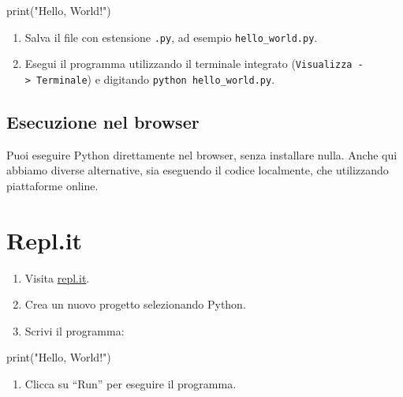\documentclass[
  letterpaper,
  DIV=11,
  numbers=noendperiod]{scrreprt}
\newenvironment{Shaded}{\begin{snugshade}}{\end{snugshade}}
\newcommand{\BuiltInTok}[1]{\textcolor[rgb]{0.00,0.23,0.31}{#1}}
\newcommand{\NormalTok}[1]{\textcolor[rgb]{0.00,0.23,0.31}{#1}}
\newcommand{\StringTok}[1]{\textcolor[rgb]{0.13,0.47,0.30}{#1}}
\providecommand{\tightlist}{%
  \setlength{\itemsep}{0pt}\setlength{\parskip}{0pt}}\usepackage{longtable,booktabs,array}
\begin{document}
\begin{Shaded}
\begin{Highlighting}[]
\BuiltInTok{print}\NormalTok{(}\StringTok{"Hello, World!"}\NormalTok{)}
\end{Highlighting}
\end{Shaded}

\begin{enumerate}
\def\labelenumi{\arabic{enumi}.}
\setcounter{enumi}{5}
\tightlist
\item
  Salva il file con estensione \texttt{.py}, ad esempio
  \texttt{hello\_world.py}.
\item
  Esegui il programma utilizzando il terminale integrato
  (\texttt{Visualizza\ -\textgreater{}\ Terminale}) e digitando
  \texttt{python\ hello\_world.py}.
\end{enumerate}

\subsection{Esecuzione nel browser}\label{esecuzione-nel-browser}

Puoi eseguire Python direttamente nel browser, senza installare nulla.
Anche qui abbiamo diverse alternative, sia eseguendo il codice
localmente, che utilizzando piattaforme online.

\section{Repl.it}

\begin{enumerate}
\def\labelenumi{\arabic{enumi}.}
\tightlist
\item
  Visita \href{https://repl.it/}{repl.it}.
\item
  Crea un nuovo progetto selezionando Python.
\item
  Scrivi il programma:
\end{enumerate}

\begin{Shaded}
\begin{Highlighting}[]
\BuiltInTok{print}\NormalTok{(}\StringTok{"Hello, World!"}\NormalTok{)}
\end{Highlighting}
\end{Shaded}

\begin{enumerate}
\def\labelenumi{\arabic{enumi}.}
\setcounter{enumi}{3}
\tightlist
\item
  Clicca su ``Run'' per eseguire il programma.
\end{enumerate}
\end{document}
